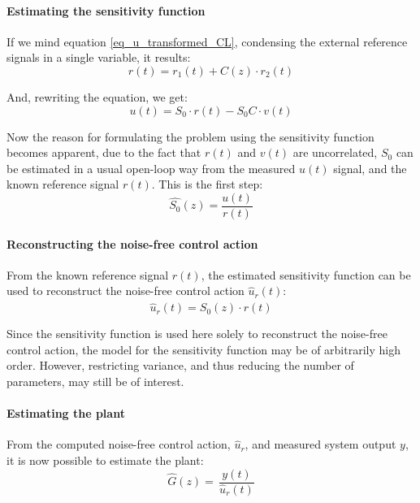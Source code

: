 \documentclass[  10pt, twoside]{report} %
\numberwithin{equation}{chapter}
\begin{document}
\paragraph{Estimating the sensitivity function}

If we mind equation \ref{eq_u_transformed_CL}, condensing the external reference signals in a single variable, it  results:
\begin{equation}
    r(t) = r_1(t) + C(z) \cdot r_2(t)
\end{equation} 

And, rewriting the equation, we get:
\begin{equation}
    u(t) = S_{0} \cdot r(t) - S_{0} C \cdot v(t) 
\end{equation}

Now the reason for formulating the problem using the sensitivity function becomes apparent, due to the fact that $r(t)$ and $v(t)$ are uncorrelated, $S_0$ can be estimated in a usual open-loop way from the measured $u(t)$ signal, and the known reference signal $r(t)$. This is the first step:
\begin{equation}
    \widehat{S_{0}}(z) = \frac{u(t)}{r(t)}
\end{equation}

\paragraph{Reconstructing the noise-free control action}
From the known reference signal $r(t)$, the estimated sensitivity function can be used to reconstruct the noise-free control action $\widehat{u}_{r}(t)$:
\begin{equation}
    \widehat{u}_{r}(t) = \widehat{S_{0}}(z) \cdot r(t)
\end{equation}

Since the sensitivity function is used here solely to reconstruct the noise-free control action, the model for the sensitivity function may be of arbitrarily high order. However, restricting variance, and thus reducing the number of parameters, may still be of interest.

\paragraph{Estimating the plant}
From the computed noise-free control action, $\widehat{u}_{r}$, and measured system output $y$, it is now possible to estimate the plant: %
\begin{equation}
    \widehat{G}(z) = \, \frac{y(t)}{\widehat{u}_{r}(t)}
\end{equation}
\end{document}
